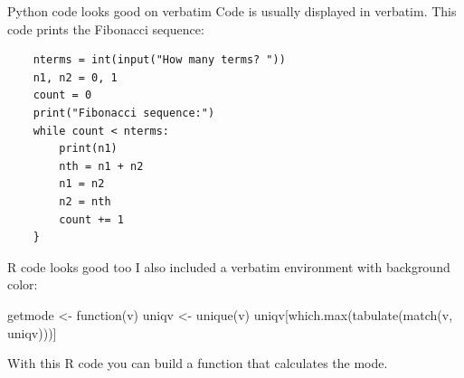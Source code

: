 
\begin{frame}[fragile]{Python code looks good on verbatim}
	Code is usually displayed in verbatim. This code prints the Fibonacci sequence:
	\begin{verbatim}
	nterms = int(input("How many terms? "))
	n1, n2 = 0, 1
	count = 0
	print("Fibonacci sequence:")
	while count < nterms:
	    print(n1)
	    nth = n1 + n2
	    n1 = n2
	    n2 = nth
	    count += 1
	}
	\end{verbatim}
\end{frame}


\begin{frame}[fragile]{R code looks good too}
	I also included a verbatim environment with background color:
	\begin{cverbatim}
getmode <- function(v) {
	uniqv <- unique(v)
	uniqv[which.max(tabulate(match(v, uniqv)))]
	}
	\end{cverbatim}
	With this R code you can build a function that calculates the mode.
\end{frame}



















